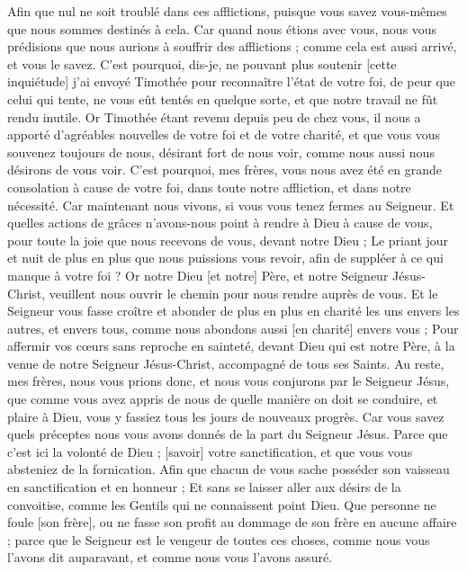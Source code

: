\begin{multicols}{2}
Afin que nul ne soit troublé dans ces afflictions, puisque vous savez vous-mêmes que nous sommes destinés à cela.
Car quand nous étions avec vous, nous vous prédisions que nous aurions à souffrir des afflictions ; comme cela est aussi arrivé, et vous le savez.
C'est pourquoi, dis-je, ne pouvant plus soutenir [cette inquiétude] j'ai envoyé Timothée pour reconnaître l'état de votre foi, de peur que celui qui tente, ne vous eût tentés en quelque sorte, et que notre travail ne fût rendu inutile.
Or Timothée étant revenu depuis peu de chez vous, il nous a apporté d'agréables nouvelles de votre foi et de votre charité, et que vous vous souvenez toujours de nous, désirant fort de nous voir, comme nous aussi nous désirons de vous voir.
C'est pourquoi, mes frères, vous nous avez été en grande consolation à cause de votre foi, dans toute notre affliction, et dans notre nécessité.
Car maintenant nous vivons, si vous vous tenez fermes au Seigneur.
Et quelles actions de grâces n'avons-nous point à rendre à Dieu à cause de vous, pour toute la joie que nous recevons de vous, devant notre Dieu ;
Le priant jour et nuit de plus en plus que nous puissions vous revoir, afin de suppléer à ce qui manque à votre foi ?
Or notre Dieu [et notre] Père, et notre Seigneur Jésus-Christ, veuillent nous ouvrir le chemin pour nous rendre auprès de vous.
Et le Seigneur vous fasse croître et abonder de plus en plus en charité les uns envers les autres, et envers tous, comme nous abondons aussi [en charité] envers vous ;
Pour affermir vos cœurs sans reproche en sainteté, devant Dieu qui est notre Père, à la venue de notre Seigneur Jésus-Christ, accompagné de tous ses Saints.
\VerseOne{}Au reste, mes frères, nous vous prions donc, et nous vous conjurons par le Seigneur Jésus, que comme vous avez appris de nous de quelle manière on doit se conduire, et plaire à Dieu, vous y fassiez tous les jours de nouveaux progrès.
Car vous savez quels préceptes nous vous avons donnés de la part du Seigneur Jésus.
Parce que c'est ici la volonté de Dieu ; [savoir] votre sanctification, et que vous vous absteniez de la fornication.
Afin que chacun de vous sache posséder son vaisseau en sanctification et en honneur ;
Et sans se laisser aller aux désirs de la convoitise, comme les Gentils qui ne connaissent point Dieu.
Que personne ne foule [son frère], ou ne fasse son profit au dommage de son frère en aucune affaire ; parce que le Seigneur est le vengeur de toutes ces choses, comme nous vous l'avons dit auparavant, et comme nous vous l'avons assuré.

\end{multicols}
